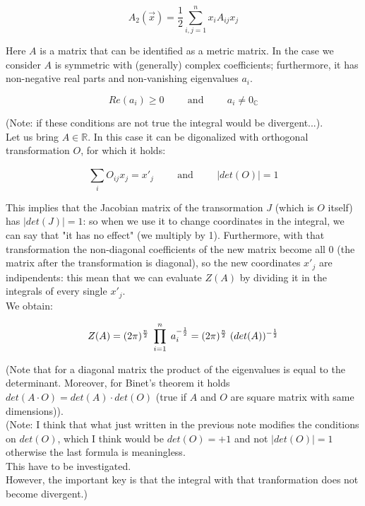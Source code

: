 \documentclass[12pt, english, a4paper]{book}
\begin{document}
\begin{equation}
A_2(\vec{x}) = \frac{1}{2} \sum\limits_{i,j = 1}^{n} x_i A_{ij} x_j
\end{equation}

Here $A$ is a matrix that can be identified as a metric matrix.
In the case we consider $A$ is symmetric with (generally) complex coefficients; furthermore, it has non-negative real parts and non-vanishing eigenvalues $a_i$.

$$ Re(a_i) \geq 0 \hspace{1cm} \mathrm{and} \hspace{1cm}  a_i \neq 0_{\mathbb{C}} $$

(Note: if these conditions are not true the integral would be divergent...).\\

Let us bring $A \in \mathbb{R}$. In this case it can be digonalized with orthogonal transformation $O$, for which it holds:

$$ \sum\limits_{i}^{} O_{ij} x_j = x'_j \hspace{1cm} \mathrm{and} \hspace{1cm} |det(O)| = 1 $$

This implies that the Jacobian matrix of the transormation $J$ (which is $O$ itself) has $|det(J)| = 1$: so when we use it to change coordinates in the integral, we can say that "it has no effect" (we multiply by 1).
Furthermore, with that transformation the non-diagonal coefficients of the new matrix become all 0 (the matrix after the transformation is diagonal), so the new coordinates $x'_j$ are indipendents: this mean that we can evaluate $Z(A)$ by dividing it in the integrals of every single $x'_j$.\\
We obtain:

\begin{equation}\label{Gaussian integral result}
Z(A) = (2\pi)^{ \frac{n}{2} } \hspace{1mm} \prod\limits_{i=1}^{n} \hspace{1mm} a_i^{ -\frac{1}{2} } = (2\pi)^{ \frac{n}{2} } \hspace{1mm} (det(A))^{ -\frac{1}{2} }
\end{equation}

(Note that for a diagonal matrix the product of the eigenvalues is equal to the determinant. Moreover, for Binet's theorem it holds $det(A \cdot O) = det(A) \cdot det(O)$ (true if $A$ and $O$ are square matrix with same dimensions)).\\
(Note: I think that what just written in the previous note modifies the conditions on $det(O)$, which I think would be $det(O) = +1$ and not $|det(O)| = 1 $ otherwise the last formula is meaningless.\\
This have to be investigated.\\
However, the important key is that the integral with that tranformation does not become divergent.)\\
\end{document}
